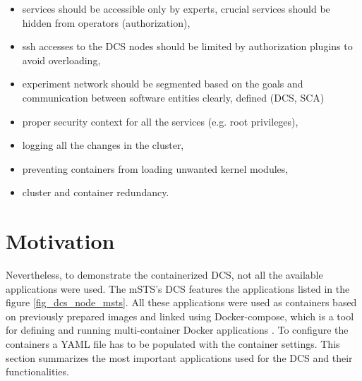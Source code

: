 \begin{itemize}
    \item services should be accessible only by experts, crucial services should be hidden from operators (authorization),
    \item ssh accesses to the DCS nodes should be limited by authorization plugins to avoid overloading,
    \item experiment network should be segmented based on the goals and communication between software entities clearly, defined (\gls{DCS}, \gls{SCA})
    \item proper security context for all the services (e.g. root privileges),
    \item logging all the changes in the cluster,
    \item preventing containers from loading unwanted kernel modules,
    \item cluster and container redundancy.
\end{itemize}

\section{Motivation}
Nevertheless, to demonstrate the containerized \gls{DCS}, not all the available applications were used. The mSTS's \gls{DCS} features the applications listed in the figure \ref{fig_dcs_node_msts}. All these applications were used as containers based on previously prepared images and linked using Docker-compose, which is a tool for defining and running multi-container Docker applications \cite{docker_compose}. To configure the containers a YAML file has to be populated with the container settings. This section summarizes the most important applications used for the DCS and their functionalities.
